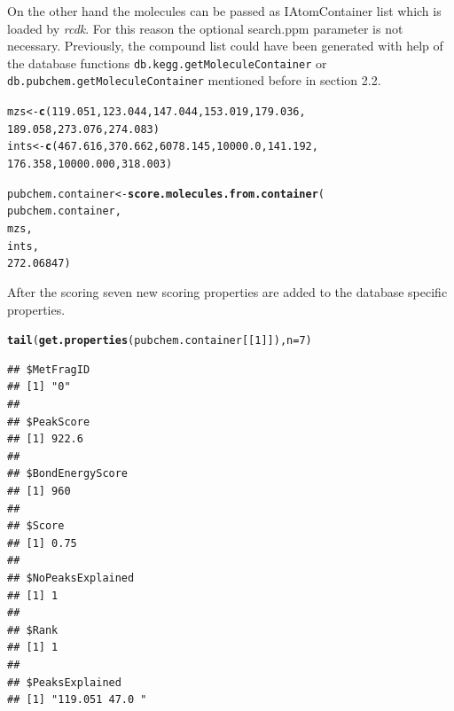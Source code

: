 \documentclass[12pt, a4paper]{scrartcl}\usepackage[]{graphicx}\usepackage[]{color}
\makeatletter
\newcommand{\hlnum}[1]{\textcolor[rgb]{0.686,0.059,0.569}{#1}}%
\newcommand{\hlstd}[1]{\textcolor[rgb]{0.345,0.345,0.345}{#1}}%
\newcommand{\hlkwb}[1]{\textcolor[rgb]{0.69,0.353,0.396}{#1}}%
\newcommand{\hlkwc}[1]{\textcolor[rgb]{0.333,0.667,0.333}{#1}}%
\newcommand{\hlkwd}[1]{\textcolor[rgb]{0.737,0.353,0.396}{\textbf{#1}}}%
\newenvironment{kframe}{%
 \def\at@end@of@kframe{}%
 \ifinner\ifhmode%
  \def\at@end@of@kframe{\end{minipage}}%
  \begin{minipage}{\columnwidth}%
 \fi\fi%
 \def\FrameCommand##1{\hskip\@totalleftmargin \hskip-\fboxsep
 \colorbox{shadecolor}{##1}\hskip-\fboxsep
     \hskip-\linewidth \hskip-\@totalleftmargin \hskip\columnwidth}%
 \MakeFramed {\advance\hsize-\width
   \@totalleftmargin\z@ \linewidth\hsize
   \@setminipage}}%
 {\par\unskip\endMakeFramed%
 \at@end@of@kframe}
\newenvironment{knitrout}{}{} %
\newcommand{\Rfunction}[1]{{\texttt{#1}}}
\newcommand{\Rpackage}[1]{{\textit{#1}}}
\makeatother
\begin{document}
On the other hand the molecules can be passed as IAtomContainer list which is loaded by \Rpackage{rcdk}. 
For this reason the optional search.ppm parameter is not necessary. Previously, the compound list could have been
generated with help of the database functions \Rfunction{db.kegg.getMoleculeContainer} or
\Rfunction{db.pubchem.getMoleculeContainer} mentioned before in section 2.2.

\begin{knitrout}
\color{fgcolor}\begin{kframe}
\begin{alltt}
  \hlstd{mzs} \hlkwb{<-} \hlkwd{c}\hlstd{(}\hlnum{119.051}\hlstd{,}\hlnum{123.044}\hlstd{,}\hlnum{147.044}\hlstd{,}\hlnum{153.019}\hlstd{,}\hlnum{179.036}\hlstd{,}
           \hlnum{189.058}\hlstd{,}\hlnum{273.076}\hlstd{,}\hlnum{274.083}\hlstd{)}
  \hlstd{ints} \hlkwb{<-}\hlkwd{c}\hlstd{(}\hlnum{467.616}\hlstd{,}\hlnum{370.662}\hlstd{,}\hlnum{6078.145}\hlstd{,}\hlnum{10000.0}\hlstd{,}\hlnum{141.192}\hlstd{,}
           \hlnum{176.358}\hlstd{,}\hlnum{10000.000}\hlstd{,}\hlnum{318.003}\hlstd{)}

  \hlstd{pubchem.container} \hlkwb{<-} \hlkwd{score.molecules.from.container}\hlstd{(}
    \hlstd{pubchem.container,}
    \hlstd{mzs,}
    \hlstd{ints,}
    \hlnum{272.06847}\hlstd{)}
\end{alltt}
\end{kframe}
\end{knitrout}

\newpage
After the scoring seven new scoring properties are added to the database specific properties.

\begin{knitrout}
\color{fgcolor}\begin{kframe}
\begin{alltt}
  \hlkwd{tail}\hlstd{(}\hlkwd{get.properties}\hlstd{(pubchem.container[[}\hlnum{1}\hlstd{]]),} \hlkwc{n}\hlstd{=}\hlnum{7}\hlstd{)}
\end{alltt}
\begin{verbatim}
## $MetFragID
## [1] "0"
## 
## $PeakScore
## [1] 922.6
## 
## $BondEnergyScore
## [1] 960
## 
## $Score
## [1] 0.75
## 
## $NoPeaksExplained
## [1] 1
## 
## $Rank
## [1] 1
## 
## $PeaksExplained
## [1] "119.051 47.0 "
\end{verbatim}
\end{kframe}
\end{knitrout}
\end{document}
